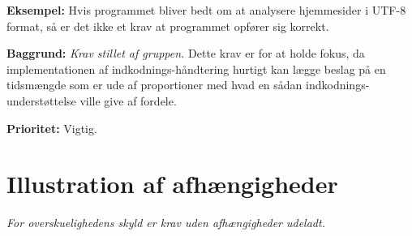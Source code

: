\documentclass[a4paper,oneside,article, titlepage]{article}
\begin{document}
\begin{description}
\item \textbf{Eksempel:} Hvis programmet bliver bedt om at analysere
  hjemmesider i UTF-8 format, så er det ikke et krav at programmet
  opfører sig korrekt.

\item \textbf{Baggrund:} \textit{Krav stillet af gruppen.} Dette krav
  er for at holde fokus, da implementationen af indkodnings-håndtering
  hurtigt kan lægge beslag på en tidsmængde som er ude af proportioner
  med hvad en sådan indkodnings-understøttelse ville give af fordele.
\item \textbf{Prioritet:} Vigtig.
\end{description}

\section{Illustration af afhængigheder}
\textit{For overskuelighedens skyld er krav uden afhængigheder
  udeladt.}
\end{document}
